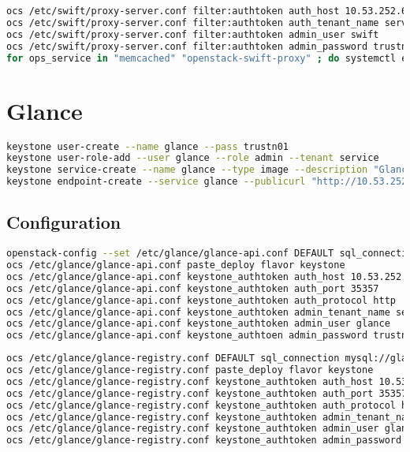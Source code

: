 \documentclass[11pt,letterpaper,oneside]{book}
\begin{document}
\begin{lstlisting}[caption={Swift Proxy},language=bash]
ocs /etc/swift/proxy-server.conf filter:authtoken auth_host 10.53.252.61
ocs /etc/swift/proxy-server.conf filter:authtoken auth_tenant_name service
ocs /etc/swift/proxy-server.conf filter:authtoken admin_user swift
ocs /etc/swift/proxy-server.conf filter:authtoken admin_password trustn01
for ops_service in "memcached" "openstack-swift-proxy" ; do systemctl enable $ops_service; systemctl start $ops_service; done
\end{lstlisting}


\chapter{Glance}

\begin{lstlisting}[caption={Glance Keystone create},language=bash]
keystone user-create --name glance --pass trustn01
keystone user-role-add --user glance --role admin --tenant service
keystone service-create --name glance --type image --description "Glance Image Service"
keystone endpoint-create --service glance --publicurl "http://10.53.252.61:9292" --adminurl "http://10.53.252.61:9292" --internalurl "http://10.53.252.61:9292"
\end{lstlisting}

\section{Configuration}
\begin{lstlisting}[caption={Glance API},language=bash]
openstack-config --set /etc/glance/glance-api.conf DEFAULT sql_connection mysql://glance:trustn01@10.53.252.61/glance
ocs /etc/glance/glance-api.conf paste_deploy flavor keystone
ocs /etc/glance/glance-api.conf keystone_authtoken auth_host 10.53.252.61
ocs /etc/glance/glance-api.conf keystone_authtoken auth_port 35357
ocs /etc/glance/glance-api.conf keystone_authtoken auth_protocol http
ocs /etc/glance/glance-api.conf keystone_authtoken admin_tenant_name service
ocs /etc/glance/glance-api.conf keystone_authtoken admin_user glance
ocs /etc/glance/glance-api.conf keystone_authtoen admin_password trustn01
\end{lstlisting}

\begin{lstlisting}[caption={Glance Registry},language=bash]
ocs /etc/glance/glance-registry.conf DEFAULT sql_connection mysql://glance:trustn01@10.53.252.61/glance
ocs /etc/glance/glance-registry.conf paste_deploy flavor keystone
ocs /etc/glance/glance-registry.conf keystone_authtoken auth_host 10.53.252.61
ocs /etc/glance/glance-registry.conf keystone_authtoken auth_port 35357
ocs /etc/glance/glance-registry.conf keystone_authtoken auth_protocol http
ocs /etc/glance/glance-registry.conf keystone_authtoken admin_tenant_name service
ocs /etc/glance/glance-registry.conf keystone_authtoken admin_user glance
ocs /etc/glance/glance-registry.conf keystone_authtoken admin_password trustn01
\end{lstlisting}
\end{document}
